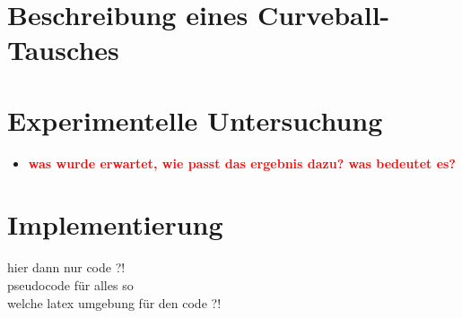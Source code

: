 \documentclass[a4paper]{scrreprt}
\theoremstyle{plain} %
\theoremstyle{definition} %
\newcommand{\ct}{Curveball-Tausch}
\newcommand{\red}[1]{\textcolor{red}{\textbf{#1}}}
\begin{document}










\chapter{Beschreibung eines \ct{es} }




\chapter{Experimentelle Untersuchung}

\begin{itemize}

\item \red{\Large was wurde erwartet, wie passt das ergebnis dazu? was bedeutet es?}



\end{itemize}





\chapter{Implementierung}
hier dann nur code ?! 
\\
pseudocode für alles so
\\
welche latex umgebung für den code ?!
\end{document}
